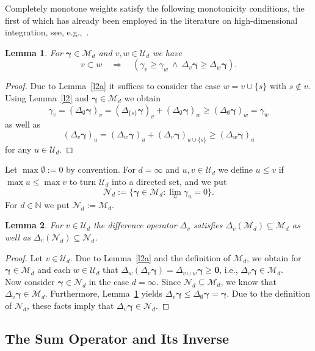\documentclass{article}
\newcommand{\N}  {{\mathbb N}}
\newcommand{\bg}{{\boldsymbol{\gamma}}}
\newcommand{\bn}{{\boldsymbol{0}}}
\newcommand{\U}  {\mathcal{U}}
\newcommand{\M}  {\mathcal{M}}
\newcommand{\mN}  {\mathcal{N}}
\theoremstyle{plain}
\newtheorem{lemma}{Lemma}
\theoremstyle{definition}
\begin{document}
Completely monotone weights satisfy the following
monotonicity conditions, 
the first of which has 
already been employed
in the literature on high-dimensional integration, 
see, e.g.,~\citet[Eqn.~(5.37)]{DKS13}.

\begin{lemma}\label{cmd:claim_i}
For $\bg \in \M_d$ and $v, w \in \U_d$ we have
\[
v \subset w \quad \Rightarrow \quad
\left(\gamma_v \geq \gamma_w \ \wedge \ \Delta_v \bg \ge \Delta_w \bg
\right).
\]
\end{lemma}

\begin{proof}
Due to Lemma~\ref{l2a} 
it suffices to consider the case $w = v \cup \{s\}$ with 
$s \not\in v$. Using Lemma~\ref{l2}
and $\bg \in \M_d$ we obtain
\[
\gamma_v = \left( \Delta_\emptyset \bg\right)_v
= \left( \Delta_{\{s\}} \bg\right)_v
+ \left( \Delta_\emptyset \bg\right)_w
\geq
\left( \Delta_\emptyset \bg\right)_w = \gamma_w
\]
as well as
\[
\left( \Delta_v \bg\right)_{u} =
\left( \Delta_w \bg\right)_{u} +
\left( \Delta_{v} \bg\right)_{u \cup \{s\}} \geq
\left( \Delta_w \bg\right)_{u}
\]
for any $u \in \U_d$.
\end{proof}

Let $\max \emptyset := 0$ by convention.
For $d = \infty$ and $u,v \in \U_d$ we define $u \leq v$ 
if $\max u \leq \max v$ to turn
$\U_d$ into a directed set, and we put
\[
\mN_d:= \{\bg \in \M_d \colon \lim_u \gamma_u = 0\}.
\]
For $d \in \N$ we put $\mN_d := \M_d$.

\begin{lemma}\label{lem:diff_op}
For $v\in \U_d$ the difference operator $\Delta_v$ 
satisfies $\Delta_v (\M_d) \subseteq \M_d$ as well as
$\Delta_v (\mN_d) \subseteq \mN_d$.
\end{lemma}

\begin{proof}
Let $v\in \U_d$. Due to Lemma~\ref{l2a} and the definition of 
$\M_d$, we obtain for $\bg \in \M_d$ and each $w\in \U_d$ that
$\Delta_w(\Delta_v \bg) = \Delta_{v \cup w} \bg \ge \bn$, i.e., 
$\Delta_v \bg \in \M_d$. \\
Now consider $\bg \in \mN_d$ in the case $d = \infty$.
Since $\mN_d \subseteq \M_d$, we know
that $\Delta_v \bg \in \M_d$. Furthermore, Lemma~\ref{cmd:claim_i} yields 
$\Delta_v \bg \le \Delta_\emptyset \bg = \bg$. Due to the definition of 
$\mN_d$, these facts imply that $\Delta_v \bg \in \mN_d$.
\end{proof}

\subsection{The Sum Operator and Its Inverse}
\label{Subsec:Sum_Op_Inv}
\end{document}

